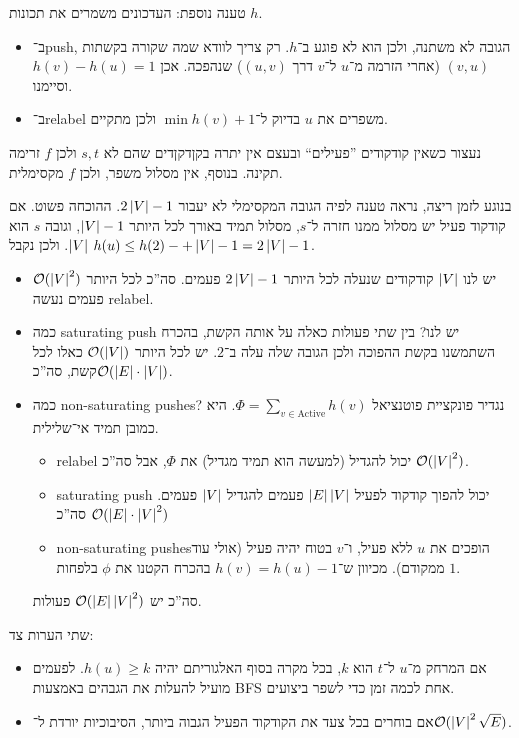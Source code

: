 \documentclass[]{../../../../tex/classes/styledArticle}
\begin{document}
	טענה נוספת: העדכונים משמרים את תכונות $h$. 
	\begin{itemize}
		\item ב־push, הגובה לא משתנה, ולכן הוא לא פוגע ב־$h$. רק צריך לוודא שמה שקורה בקשתות $(v, u)$ (אחרי הזרמה מ־$u$ ל־$v$ דרך $(u, v)$) שנהפכה. אכן $h(v) - h(u) = 1$ וסיימנו. 
		\item ב־relabel משפרים את $u$ בדיוק ל־$\min h(v) + 1$ ולכן מתקיים. 
	\end{itemize}
	נעצור כשאין קודקודים ''פעילים`` ובעצם אין יתרה בקןדקןדים שהם לא $s, t$ ולכן $f$ זרימה תקינה. בנוסף, אין מסלול משפר, ולכן $f$ מקסימלית. 
	
	בנוגע לזמן ריצה, נראה טענה לפיה הגובה המקסימלי לא יעבור $2 \left \lvert V \right \rvert - 1$. ההוכחה פשוט. אם קודקוד פעיל יש מסלול ממנו חזרה ל־$s$, מסלול תמיד באורך לכל היותר $\left \lvert V \right \rvert - 1$, וגובה $s$ הוא $\left \lvert V \right \rvert$. ולכן נקבל $h(u) \le h(2) -+ \left \lvert V \right \rvert - 1 = 2 \left \lvert V \right \rvert - 1$. 
	
	\begin{itemize}
		\item יש לנו $\left \lvert V \right \rvert$ קודקודים שנעלה לכל היותר $2 \left \lvert V \right \rvert - 1$ פעמים. סה''כ לכל היותר $\mathcal{O}(\left \lvert V \right \rvert^{2})$ פעמים נעשה relabel. 
		\item כמה saturating push יש לנו? בין שתי פעולות כאלה על אותה הקשת, בהכרח השתמשנו בקשת ההפוכה ולכן הגובה שלה עלה ב־$2$. יש לכל היותר $\mathcal{O}(\left \lvert V \right \rvert)$ כאלו לכל קשת, סה''כ$\mathcal{O}(\left \lvert E \right \rvert \cdot \left \lvert V \right \rvert)$. 
		\item כמה non-saturating pushes? נגדיר פונקציית פוטנציאל $\Phi = \sum_{v \in \mathrm{Active}}h(v)$. היא כמובן תמיד אי־שלילית. 
		\begin{itemize}
			\item relabel יכול להגדיל (למעשה הוא תמיד מגדיל) את $\Phi$, אבל סה''כ $\mathcal{O}(\left \lvert V \right \rvert^{2})$. 
			\item saturating push יכול להפוך קודקוד לפעיל $\left \lvert E \right \rvert \left \lvert V \right \rvert$ פעמים להגדיל $\left \lvert V \right \rvert$ פעמים. סה''כ $\mathcal{O}(\left \lvert E \right \rvert \cdot \left \lvert V \right \rvert^2)$
			\item non-saturating pushesהופכים את $u$ ללא פעיל, ו־$v$ בטוח יהיה פעיל (אולי עוד ממקודם). מכיוון ש־$h(v) = h(u) - 1$ בהכרח הקטנו את $\phi$ בלפחות $1$. 
		\end{itemize}
		סה''כ יש $\mathcal{O}(\left \lvert E \right \rvert \left \lvert V \right \rvert^{2})$ פעולות. 
	\end{itemize}
	
	שתי הערות צד: 
	
	\begin{itemize}
		\item אם המרחק מ־$u$ ל־$t$ הוא $k$, בכל מקרה בסוף האלגוריתם יהיה $h(u) \ge k$. לפעמים מועיל להעלות את הגבהים באמצעות BFS אחת לכמה זמן כדי לשפר ביצועים. 
		\item אם בוחרים בכל צעד את הקודקוד הפעיל הגבוה ביותר, הסיבוכיות יורדת ל־$\mathcal{O}(\left \lvert V \right \rvert^2 \sqrt{E})$. 
	\end{itemize}
	
	
	
	
	\ndoc
\end{document}
